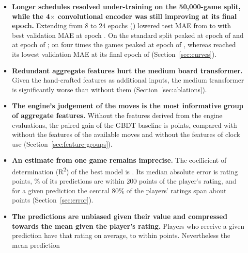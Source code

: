 \documentclass[11pt]{article}
\begin{document}
\begin{itemize}
(Section~\ref{sec:seq-ablations}).
\item \textbf{Longer schedules resolved under-training on the 50{,}000-game
split, while the 4$\times$ convolutional encoder was still improving at its
final epoch.} Extending  from 8 to 24 epochs
() lowered test MAE from  to
 with best validation MAE at epoch
. On the standard split 
peaked at epoch  of 
and  at epoch  of
; on four times the games
 peaked at epoch
 of
, whereas  reached its
lowest validation MAE at its final epoch  of
 (Section~\ref{sec:curves}).
\ifchangehand
\item \textbf{Redundant aggregate features hurt the medium board transformer.}
Given the hand-crafted features as additional inputs, the medium transformer
is significantly worse than without them (Section~\ref{sec:ablations}).
\fi
\iffeatures
\item \textbf{The engine's judgement of the moves is the most informative
group of aggregate features.} Without the features derived from the engine
evaluations, the paired gain of the GBDT baseline is
 points, compared with
 without the features of the
available moves and  without the
features of clock use (Section~\ref{sec:feature-groups}).
\fi
\item \textbf{An estimate from one game remains imprecise.} The coefficient
of determination (R\textsuperscript{2}) of the best model is
.\iflook{} Its median absolute error is 
rating points, \% of its predictions are within 200
points of the player's rating, and for a given prediction the central 80\% of
the players' ratings span about  points
(Section~\ref{sec:error}).\fi
\iflook
\item \textbf{The predictions are unbiased given their value and compressed
towards the mean given the player's rating.} Players who receive a given
prediction have that rating on average, to within
 points. Nevertheless the mean prediction

\end{itemize}
\end{document}
